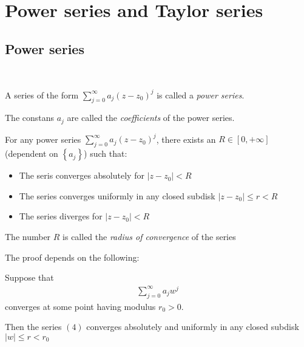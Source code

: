 \section{Power series and Taylor series}
\par\bigskip
\subsection{Power series}\hfill\\
\par\bigskip
\begin{theo}[]{}
  A series of the form $\sum_{j=0}^{\infty}a_j(z-z_0)^j$ is called a \textit{power series}.\par
  \noindent The constans $a_j$ are called the \textit{coefficients} of the power series.
\end{theo}
\par\bigskip
\begin{theo}[]{}
  For any power series $\sum_{j=0}^{\infty}a_j(z-z_0)^j$, there exists an $R\in[0,+\infty]$ (dependent on $\left\{a_j\right\}$) such that:\par
  \begin{itemize}
    \item The seris converges absolutely for $\left|z-z_0\right|<R$
    \item The series converges uniformly in any closed subdisk $\left|z-z_0\right|\leq r<R$
    \item The series diverges for $\left|z-z_0\right|<R$
  \end{itemize}
  \par\bigskip
  \noindent The number $R$ is called the \textit{radius of convergence} of the series
\end{theo}
\par\bigskip
\noindent The proof depends on the following:
\par\bigskip
\begin{lem}[]{}
  Suppose that
  \begin{equation}
    \begin{gathered}
      \sum_{j=0}^{\infty}a_jw^j
    \end{gathered}
  \end{equation}
  converges at some point having modulus $r_0>0$.
  \par\bigskip
  \noindent Then the series $(4)$ converges absolutely and uniformly in any closed subdisk $|w|\leq r<r_0$
\end{lem}
\par\bigskip
